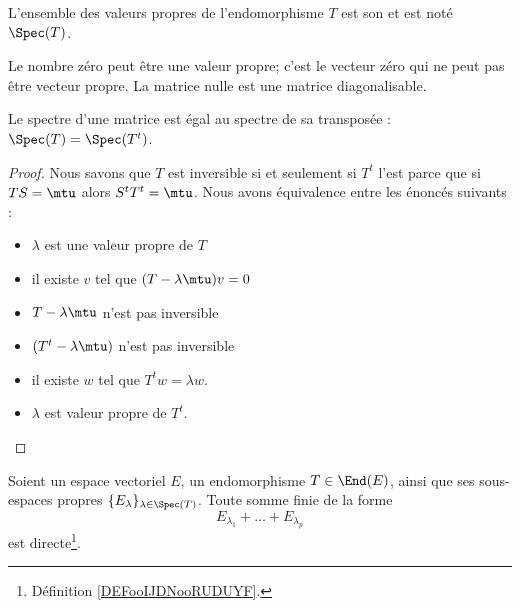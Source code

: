 \begin{definition}
	L'ensemble des valeurs propres de l'endomorphisme \( T\) est son  et est noté \( \Spec(T)\).
\end{definition}

\begin{remark}
	Le nombre zéro peut être une valeur propre; c'est le vecteur zéro qui ne peut pas être vecteur propre. La matrice nulle est une matrice diagonalisable.
\end{remark}

\begin{lemma}     \label{LEMooWHWUooFFXlzT}
    Le spectre d'une matrice est égal au spectre de sa transposée : \( \Spec(T)=\Spec(T^t)\).
\end{lemma}

\begin{proof}
    Nous savons que \( T\) est inversible si et seulement si \( T^t\) l'est parce que si \( TS=\mtu\) alors \( S^tT^t=\mtu\). Nous avons équivalence entre les énoncés suivants :
    \begin{itemize}
        \item \( \lambda\) est une valeur propre de \( T\)
        \item
            il existe \( v\) tel que \( (T-\lambda\mtu)v=0\)
        \item
            \( T-\lambda\mtu\) n'est pas inversible
        \item
        \( (T^t-\lambda\mtu)\) n'est pas inversible
    \item
        il existe \( w\) tel que \( T^tw=\lambda w\).
    \item
        \( \lambda\) est valeur propre de \( T^t\).
    \end{itemize}
\end{proof}

\begin{lemma}       \label{LemjcztYH}
	Soient un espace vectoriel \( E\), un endomorphisme \( T\in \End(E)\), ainsi que ses sous-espaces propres \( \{ E_{\lambda} \}_{\lambda\in \Spec(T)}  \). Toute somme finie de la forme
	\begin{equation}
		E_{\lambda_1}+\ldots+E_{\lambda_p}
	\end{equation}
	est directe\footnote{Définition \ref{DEFooIJDNooRUDUYF}.}.
\end{lemma}

